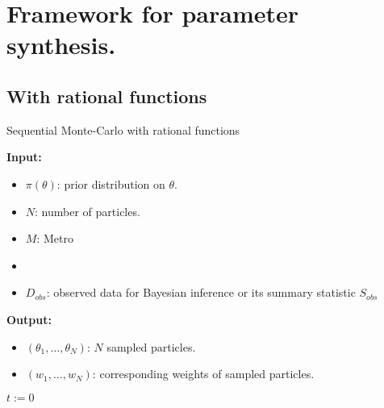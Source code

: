 \chapter{Framework for parameter synthesis.}
\section{With rational functions}
\begin{algorithm}[H]
    \caption{Sequential Monte-Carlo with rational functions}
    \label{smcrf-alg}
    \hspace*{\algorithmicindent} \textbf{Input:}
    \begin{itemize}
        \item $\pi(\theta)$: prior distribution on $\theta$.
        \item $N$: number of particles.
        \item $M$: Metro
        \item \item $D_{obs}$: observed data for Bayesian inference or its summary statistic $S_{obs}$
    \end{itemize}
    \hspace*{\algorithmicindent} \textbf{Output:}
    \begin{itemize}
        \item $(\theta_1,\ldots,\theta_N)$: $N$ sampled particles.
        \item $(w_1,\ldots,w_N)$: corresponding weights of sampled particles.
    \end{itemize}
    \begin{algorithmic}[1]
        \State $t:=0$
        \EndWhile
        \EndProcedure
    \end{algorithmic}
\end{algorithm}



